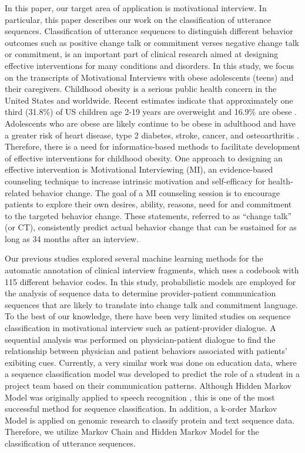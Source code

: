 \documentclass{amia}
\begin{document}
In this paper, our target area of application is motivational interview. In particular, this paper describes our work on the classification of utterance sequences. Classification of utterance sequences to distinguish different behavior outcomes such as positive change talk or commitment verses negative change talk or commitment, is an important part of clinical research aimed at designing effective interventions for many conditions and disorders. In this study, we focus on the transcripts of Motivational Interviews with obese adolescents (teens) and their caregivers. Childhood obesity is a serious public health concern in the United States and worldwide. Recent estimates indicate that approximately one third (31.8\%) of US children age 2-19 years are overweight and 16.9\% are obese \cite{ogden2012prevalence}. Adolescents who are obese are likely continue to be obese in adulthood and have a greater risk of heart disease, type 2 diabetes, stroke, cancer, and osteoarthritis \cite{general2010surgeon}. Therefore, there is a need for informatics-based methods to facilitate development of effective interventions for childhood obesity. One approach to designing an effective intervention is Motivational Interviewing (MI), an evidence-based counseling technique to increase intrinsic motivation and self-efficacy for health-related behavior change. The goal of a MI counseling session is to encourage patients to explore their own desires, ability, reasons, need for and commitment to the targeted behavior change. These statements, referred to as ``change talk'' (or CT), consistently predict actual behavior change that can be sustained for as long as 34 months after an interview. 

Our previous studies \cite{kotov2015interpretable, hasan2016study} explored several machine learning methods for the automatic annotation of clinical interview fragments, which uses a codebook \cite{carcone2013provider} with 115 different behavior codes. In this study, probabilistic models are employed for the analysis of sequence data to determine provider-patient communication sequences that are likely to translate into change talk and commitment language. To the best of our knowledge, there have been very limited studies on sequence classification in motivational interview such as patient-provider dialogue. A sequential analysis \cite{eide2004physician} was performed on physician-patient dialogue to find the relationship between physician and patient behaviors associated with patients' exibiting cues. Currently, a very similar work \cite{jaber2016multi} was done on education data, where a sequence classification model was developed to predict the role of a student in a project team based on their communication patterns. Although Hidden Markov Model was originally applied to speech recognition \cite{rabiner1989tutorial}, this is one of the most successful method \cite{mutsam2016maximum, eickeler1998hidden, srivastava2007hmm, won2004training, chai2001folk} for sequence classification. In addition, a k-order Markov Model is applied on genomic research \cite{yakhnenko2005discriminatively} to classify protein and text sequence data.  Therefore, we utilize Markov Chain and Hidden Markov Model for the classification of utterance sequences.   
\end{document}
